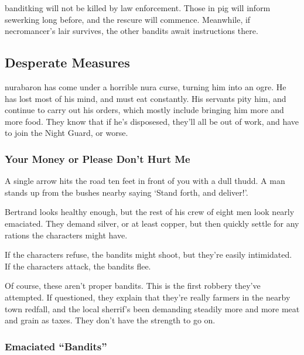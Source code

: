 \Gls{banditking} will not be killed by law enforcement.  Those in \gls{pig} will inform \gls{sewerking} long before, and the rescure will commence.  Meanwhile, if \gls{necromancer}'s lair survives, the other bandits await instructions there.

\subsection[Desperate Measures]{Desperate Measures}\label{desperatemeasures}

\gls{nurabaron} has come under a horrible nura curse, turning him into an ogre.  He has lost most of his mind, and must eat constantly.  His servants pity him, and continue to carry out his orders, which mostly include bringing him more and more food.  They know that if he's disposesed, they'll all be out of work, and have to join the Night Guard, or worse.

\subsubsection{Your Money or Please Don't Hurt Me}

\begin{boxtext}
A single arrow hits the road ten feet in front of you with a dull thudd.  A man stands up from the bushes nearby saying `Stand forth, and deliver!'.
\end{boxtext}

Bertrand looks healthy enough, but the rest of his crew of eight men look nearly emaciated.  They demand silver, or at least copper, but then quickly settle for any rations the characters might have.

If the characters refuse, the bandits might shoot, but they're easily intimidated.  If the characters attack, the bandits flee.

Of course, these aren't proper bandits.  This is the first robbery they've attempted.  If questioned, they explain that they're really farmers in the nearby town \gls{redfall}, and the local sherrif's been demanding steadily more and more meat and grain as taxes.  They don't have the strength to go on.

\humansoldier

\subsubsection{Emaciated ``Bandits''}

